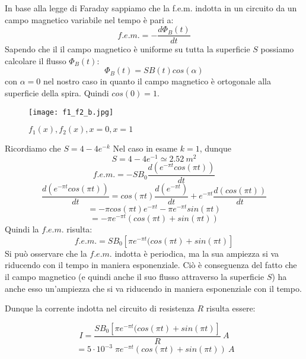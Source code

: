 \documentclass[a4paper,12pt]{article}
\begin{document}
\begin{enumerate}
In base alla legge di Faraday sappiamo che la f.e.m. indotta in un circuito da un campo magnetico variabile nel tempo è pari a:
\begin{equation}f.e.m.=-\frac{d\Phi_B(t)}{dt}\end{equation}
Sapendo che il il campo magnetico è uniforme su tutta la superficie $S$ possiamo calcolare il flusso $\Phi_B(t)$:
\begin{equation}\Phi_B(t)=SB(t)cos(\alpha)\end{equation}
con $\alpha=0$ nel nostro caso in quanto il campo magnetico è ortogonale alla superficie della spira. Quindi $cos(0)=1$.
\begin{figure}[H]
\centering
\texttt{[image: f1\_f2\_b.jpg]}
\caption {$f_1(x), f_2(x), x=0, x=1$}
\end{figure}
Ricordiamo che $S=4-4e^{-k}$
Nel caso in esame $k=1$, dunque
\begin{equation} S=4-4e^{-1} \simeq 2.52\  m^2\end{equation}
\begin{equation}f.e.m.=-SB_0\frac{d(e^{-\pi t}cos(\pi t))}{dt}\end{equation}
\begin{equation}\frac{d(e^{-\pi t}cos(\pi t))}{dt}=cos(\pi t)\frac{d(e^{-\pi t})}{dt}+e^{-\pi t}\frac{d(cos(\pi t))}{dt}\end{equation}
\begin{equation}=-\pi cos(\pi t) e^{-\pi t}-\pi e^{-\pi t}sin(\pi t)\end{equation}
\begin{equation}=-\pi e^{-\pi t}( cos(\pi t) + sin(\pi t))\end{equation}
Quindi la $f.e.m.$ risulta:
\begin{equation}f.e.m.=SB_0[\pi e^{-\pi t}(cos(\pi t)+ sin(\pi t)]\end{equation}
Si può osservare che la $f.e.m.$ indotta è periodica, ma la sua ampiezza si va riducendo con il tempo in maniera esponenziale.
Ciò è conseguenza del fatto che il campo magnetico (e quindi anche il suo flusso attraverso la superficie $S$) ha anche esso un'ampiezza che si va riducendo in maniera esponenziale con il tempo.

Dunque la corrente indotta nel circuito di resistenza $R$ risulta essere:

\begin{equation}I=\frac{SB_0[\pi e^{-\pi t}(cos(\pi t)+ sin(\pi t)]}{R}\ A\end{equation}
\begin{equation}\;=5\cdot10^{-3}\;\pi e^{-\pi t}(cos(\pi t)+ sin(\pi t))\ A\end{equation}


\end{enumerate}
\end{document}
